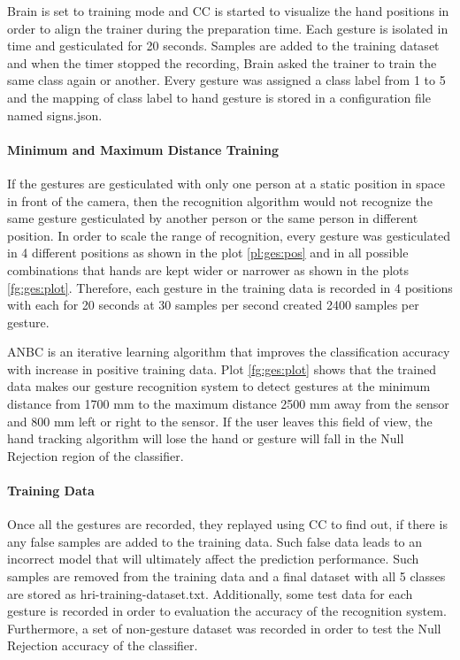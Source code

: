 

Brain is set to training mode and CC is started to visualize the hand positions in order to align the trainer during the preparation time. Each gesture is isolated in time and gesticulated for 20 seconds. Samples are added to the training dataset and when the timer stopped the recording, Brain asked the trainer to train the same class again or another. Every gesture was assigned a class label from 1 to 5 and the mapping of class label to hand gesture is stored in a configuration file named signs.json. 



\paragraph*{Minimum and Maximum Distance Training} \label{sec:range:train} If the gestures are gesticulated with only one person at a static position in space in front of the camera, then the recognition algorithm would not recognize the same gesture gesticulated by another person or the same person in different position. In order to scale the range of recognition, every gesture was gesticulated in 4 different positions as shown in the plot \ref{pl:ges:pos} and in all possible combinations that hands are kept wider or narrower as shown in the plots \ref{fg:ges:plot}. Therefore, each gesture in the training data is recorded in 4 positions with each for 20 seconds at 30 samples per second created 2400 samples per gesture. 

ANBC is an iterative learning algorithm that improves the classification accuracy with increase in positive training data. Plot \ref{fg:ges:plot} shows that the trained data makes our gesture recognition system to detect gestures at the minimum distance from 1700 mm to the maximum distance 2500 mm away from the sensor and 800 mm left or right to the sensor. If the user leaves this field of view, the hand tracking algorithm will lose the hand or gesture will fall in the Null Rejection region of the classifier.



\paragraph*{Training Data} Once all the gestures are recorded, they replayed using CC to find out, if there is any false samples are added to the training data. Such false data leads to an incorrect model that will ultimately affect the prediction performance. Such samples are removed from the training data and a final dataset with all 5 classes are stored as hri-training-dataset.txt. Additionally, some test data for each gesture is recorded in order to evaluation the accuracy of the recognition system. Furthermore, a set of non-gesture dataset was recorded in order to test the Null Rejection accuracy of the classifier. 

